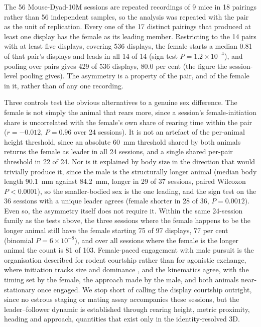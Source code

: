 \documentclass[pdflatex, sn-nature]{sn-jnl}
\theoremstyle{thmstyleone}%
\theoremstyle{thmstyletwo}%
\theoremstyle{thmstylethree}%
\begin{document}
The 56 Mouse-Dyad-10M sessions are repeated recordings of 9 mice in 18 pairings rather than 56 independent samples, so the analysis was repeated with the pair as the unit of replication. Every one of the 17 distinct pairings that produced at least one display has the female as its leading member. Restricting to the 14 pairs with at least five displays, covering 536 displays, the female starts a median 0.81 of that pair's displays and leads in all 14 of 14 (sign test $P = 1.2 \times 10^{-4}$), and pooling over pairs gives 429 of 536 displays, 80.0 per cent (the figure the session-level pooling gives). The asymmetry is a property of the pair, and of the female in it, rather than of any one recording.

Three controls test the obvious alternatives to a genuine sex difference. The female is not simply the animal that rears more, since a session's female-initiation share is uncorrelated with the female's own share of rearing time within the pair ($r = -0.012$, $P = 0.96$ over 24 sessions). It is not an artefact of the per-animal height threshold, since an absolute 60~mm threshold shared by both animals returns the female as leader in all 24 sessions, and a single shared per-pair threshold in 22 of 24. Nor is it explained by body size in the direction that would trivially produce it, since the male is the structurally longer animal (median body length 90.1~mm against 84.2~mm, longer in 29 of 37 sessions, paired Wilcoxon $P < 0.0001$), so the smaller-bodied sex is the one leading, and the sign test on the 36 sessions with a unique leader agrees (female shorter in 28 of 36, $P = 0.0012$). Even so, the asymmetry itself does not require it. Within the same 24-session family as the tests above, the three sessions where the female happens to be the longer animal still have the female starting 75 of 97 displays, 77 per cent (binomial $P = 6 \times 10^{-8}$), and over all sessions where the female is the longer animal the count is 81 of 103. Female-paced engagement with male pursuit is the organisation described for rodent courtship rather than for agonistic exchange, where initiation tracks size and dominance \citep{Beach1976,McClintock1978,Erskine1989}, and the kinematics agree, with the timing set by the female, the approach made by the male, and both animals near-stationary once engaged. We stop short of calling the display courtship outright, since no estrous staging or mating assay accompanies these sessions, but the leader--follower dynamic is established through rearing height, metric proximity, heading and approach, quantities that exist only in the identity-resolved 3D.
\end{document}
